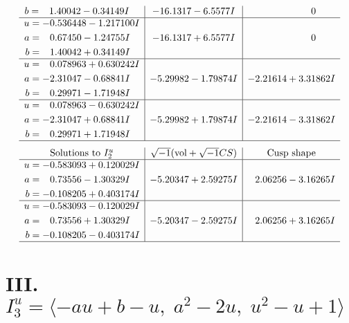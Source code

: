 \documentclass[1p]{elsarticle_modified}
\theoremstyle{definition}
\newcommand{\I}{\sqrt{-1}}
\begin{document}
$$\begin{array}{c|c|c}
\begin{aligned}
b &= \phantom{-}1.40042 - 0.34149 I\end{aligned}
 & -16.1317 - 6.5577 I & \phantom{-0.000000 } 0 \\ \hline\begin{aligned}
u &= -0.536448 - 1.217100 I \\
a &= \phantom{-}0.67450 - 1.24755 I \\
b &= \phantom{-}1.40042 + 0.34149 I\end{aligned}
 & -16.1317 + 6.5577 I & \phantom{-0.000000 } 0 \\ \hline\begin{aligned}
u &= \phantom{-}0.078963 + 0.630242 I \\
a &= -2.31047 - 0.68841 I \\
b &= \phantom{-}0.29971 - 1.71948 I\end{aligned}
 & -5.29982 - 1.79874 I & -2.21614 + 3.31862 I \\ \hline\begin{aligned}
u &= \phantom{-}0.078963 - 0.630242 I \\
a &= -2.31047 + 0.68841 I \\
b &= \phantom{-}0.29971 + 1.71948 I\end{aligned}
 & -5.29982 + 1.79874 I & -2.21614 - 3.31862 I\\
 \hline 
 \end{array}$$\newpage$$\begin{array}{c|c|c}  
\text{Solutions to }I^u_{2}& \I (\text{vol} + \sqrt{-1}CS) & \text{Cusp shape}\\
 \hline 
\begin{aligned}
u &= -0.583093 + 0.120029 I \\
a &= \phantom{-}0.73556 - 1.30329 I \\
b &= -0.108205 + 0.403174 I\end{aligned}
 & -5.20347 + 2.59275 I & \phantom{-}2.06256 - 3.16265 I \\ \hline\begin{aligned}
u &= -0.583093 - 0.120029 I \\
a &= \phantom{-}0.73556 + 1.30329 I \\
b &= -0.108205 - 0.403174 I\end{aligned}
 & -5.20347 - 2.59275 I & \phantom{-}2.06256 + 3.16265 I\\
 \hline 
 \end{array}$$\newpage\newpage\renewcommand{\arraystretch}{1}
\centering \section*{III. $I^u_{3}= \langle - a u+b- u,\;a^2-2 u,\;u^2- u+1 \rangle$}
\end{document}
